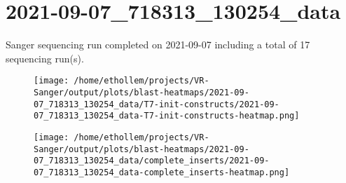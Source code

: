 \section{2021-09-07\_718313\_130254\_data}

    Sanger sequencing run completed on 2021-09-07
    including a total of 17 sequencing
    run(s).
    

    \begin{figure}[!h]
        \texttt{[image: /home/ethollem/projects/VR-Sanger/output/plots/blast-heatmaps/2021-09-07\_718313\_130254\_data/T7-init-constructs/2021-09-07\_718313\_130254\_data-T7-init-constructs-heatmap.png]}
        \centering
    \end{figure}


    \begin{figure}[!h]
        \texttt{[image: /home/ethollem/projects/VR-Sanger/output/plots/blast-heatmaps/2021-09-07\_718313\_130254\_data/complete\_inserts/2021-09-07\_718313\_130254\_data-complete\_inserts-heatmap.png]}
        \centering
    \end{figure}

\pagebreak